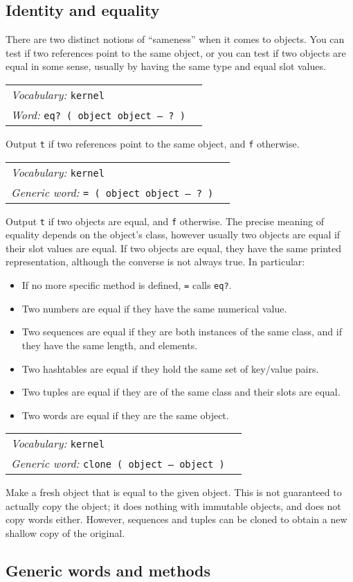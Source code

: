 \documentclass{book}
\newcommand{\vocabulary}[1]{\emph{Vocabulary:} \texttt{#1}&\\}
\newcommand{\ordinaryword}[2]{\index{\texttt{#1}}\emph{Word:} \texttt{#2}&\\}
\newcommand{\genericword}[2]{\index{\texttt{#1}}\emph{Generic word:} \texttt{#2}&\\}
\newcommand{\wordtable}[1]{


\begin{tabularx}{12cm}{lX}
\hline
#1
\hline
\end{tabularx}

}
\begin{document}
\subsection{Identity and equality}\label{equality}

There are two distinct notions of ``sameness'' when it comes to objects. You can test if two references point to the same object, or you can test if two objects are equal in some sense, usually by having the same type and equal slot values.
\wordtable{
\vocabulary{kernel}
\ordinaryword{eq?}{eq?~( object object -- ?~)}
}
Output \texttt{t} if two references point to the same object, and \texttt{f} otherwise.
\wordtable{
\vocabulary{kernel}
\genericword{=}{= ( object object -- ?~)}
}
Output \texttt{t} if two objects are equal, and \texttt{f} otherwise. The precise meaning of equality depends on the object's class, however usually two objects are equal if their slot values are equal. If two objects are equal, they have the same printed representation, although the converse is not always true. In particular:
\begin{itemize}
\item If no more specific method is defined, \texttt{=} calls \texttt{eq?}.
\item Two numbers are equal if they have the same numerical value.
\item Two sequences are equal if they are both instances of the same class, and if they have the same length, and elements.
\item Two hashtables are equal if they hold the same set of key/value pairs.
\item Two tuples are equal if they are of the same class and their slots are equal.
\item Two words are equal if they are the same object.
\end{itemize}
\wordtable{
\vocabulary{kernel}
\genericword{clone}{clone ( object -- object )}
}
Make a fresh object that is equal to the given object. This is not guaranteed to actually copy the object; it does nothing with immutable objects, and does not copy words either. However, sequences and tuples can be cloned to obtain a new shallow copy of the original.

\subsection{Generic words and methods}\label{generic}
\end{document}
